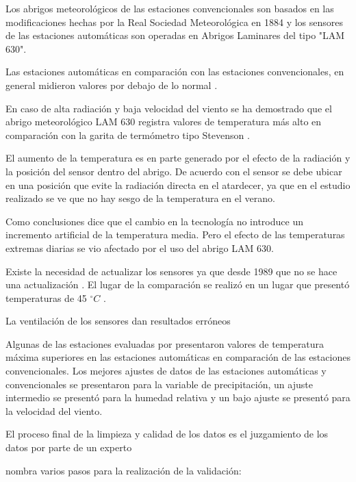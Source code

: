 \documentclass[11pt]{article}
\def\celc{$^{\circ}C$ }%
\begin{document}
Los abrigos meteorológicos de las estaciones convencionales son basados en las modificaciones hechas por la Real Sociedad Meteorológica en 1884 y los sensores de las estaciones automáticas son operadas en Abrigos Laminares del tipo "LAM 630".

Las estaciones automáticas en comparación con las estaciones convencionales, en general midieron valores por debajo de lo normal \citet{kamtz1831lehrbuch}.

En caso de alta radiación y baja velocidad del viento se ha demostrado que el abrigo meteorológico LAM 630 registra valores de temperatura más alto en comparación con la garita de termómetro tipo Stevenson \citep{lacombe2010results, kaspar2016climate}.

El aumento de la temperatura es en parte generado por el efecto de la radiación y la posición del sensor dentro del abrigo. De acuerdo con \citet{kaspar2016climate} el sensor se debe ubicar en una posición que evite la radiación directa en el atardecer, ya que en el estudio realizado se ve que no hay sesgo de la temperatura en el verano.

Como conclusiones \citet{kaspar2016climate} dice que el cambio en la tecnología no introduce un incremento artificial de la temperatura media. Pero el efecto de las temperaturas extremas diarias se vio afectado por el uso del abrigo LAM 630.

Existe la necesidad de actualizar los sensores ya que desde 1989 que no se hace una actualización \citep{lacombe2010results}. El lugar de la comparación se realizó en un lugar que presentó temperaturas de 45 \celc. 

La ventilación de los sensores dan resultados erróneos \citep{lacombe2010results}

Algunas de las estaciones evaluadas por \citet{Soares2017} presentaron valores de temperatura máxima superiores en las estaciones automáticas en comparación de las estaciones convencionales. Los mejores ajustes de datos de las estaciones automáticas y convencionales se presentaron para la variable de precipitación, un ajuste intermedio se presentó para la humedad relativa y un bajo ajuste se presentó para la velocidad del viento.

El proceso final de la limpieza y calidad de los datos es el juzgamiento de los datos por parte de un experto \citep{Estevez2008}

\cite{Estevez2008} nombra varios pasos para la realización de la validación:
\end{document}
